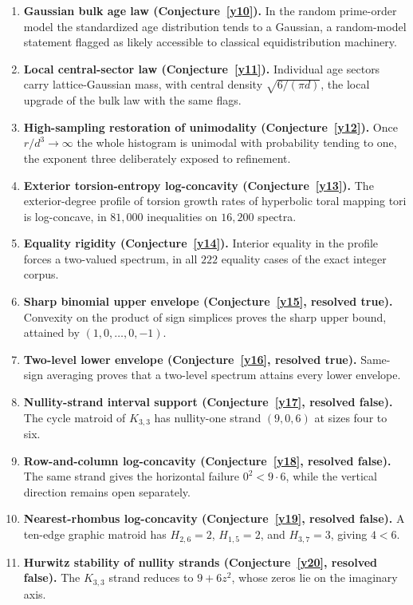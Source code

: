 \documentclass[11pt]{article}
\theoremstyle{definition}
\begin{document}
\begin{enumerate}
\item \textbf{Gaussian bulk age law (Conjecture~\ref{y10}).}  In the random prime-order model the standardized age distribution tends to a Gaussian, a random-model statement flagged as likely accessible to classical equidistribution machinery.
\item \textbf{Local central-sector law (Conjecture~\ref{y11}).}  Individual age sectors carry lattice-Gaussian mass, with central density $\sqrt{6/(\pi d)}$, the local upgrade of the bulk law with the same flags.
\item \textbf{High-sampling restoration of unimodality (Conjecture~\ref{y12}).}  Once $r/d^3\to\infty$ the whole histogram is unimodal with probability tending to one, the exponent three deliberately exposed to refinement.
\item \textbf{Exterior torsion-entropy log-concavity (Conjecture~\ref{y13}).}  The exterior-degree profile of torsion growth rates of hyperbolic toral mapping tori is log-concave, in $81{,}000$ inequalities on $16{,}200$ spectra.
\item \textbf{Equality rigidity (Conjecture~\ref{y14}).}  Interior equality in the profile forces a two-valued spectrum, in all $222$ equality cases of the exact integer corpus.
\item \textbf{Sharp binomial upper envelope (Conjecture~\ref{y15}, resolved true).}  Convexity on the product of sign simplices proves the sharp upper bound, attained by $(1,0,\ldots,0,-1)$.
\item \textbf{Two-level lower envelope (Conjecture~\ref{y16}, resolved true).}  Same-sign averaging proves that a two-level spectrum attains every lower envelope.
\item \textbf{Nullity-strand interval support (Conjecture~\ref{y17}, resolved false).}  The cycle matroid of $K_{3,3}$ has nullity-one strand $(9,0,6)$ at sizes four to six.
\item \textbf{Row-and-column log-concavity (Conjecture~\ref{y18}, resolved false).}  The same strand gives the horizontal failure $0^2<9\cdot6$, while the vertical direction remains open separately.
\item \textbf{Nearest-rhombus log-concavity (Conjecture~\ref{y19}, resolved false).}  A ten-edge graphic matroid has $H_{2,6}=2$, $H_{1,5}=2$, and $H_{3,7}=3$, giving $4<6$.
\item \textbf{Hurwitz stability of nullity strands (Conjecture~\ref{y20}, resolved false).}  The $K_{3,3}$ strand reduces to $9+6z^2$, whose zeros lie on the imaginary axis.
\end{enumerate}
\end{document}
